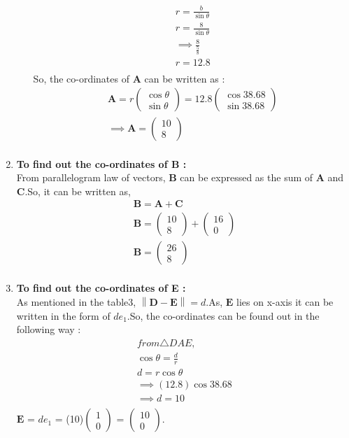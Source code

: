 \documentclass{article}
\providecommand{\norm}[1]{\left\lVert#1\right\rVert}
\newcommand{\myvec}[1]{\ensuremath{\begin{pmatrix}#1\end{pmatrix}}}
\let\vec\mathbf
\begin{document}
\begin{enumerate}
\begin{enumerate}
\begin{align}
			r = \frac{b}{\sin{\theta}}\\
			r = \frac{8}{\sin{\theta}}\\
			\implies \frac{8}{\frac{5}{8}}\\
			r = 12.8\\
		\end{align}
		So, the co-ordinates of $\vec{A}$ can be written as :\\
		\begin{align}
			\vec{A} = r\myvec{\cos{\theta}\\\sin{\theta}} = 12.8\myvec{\cos{38.68}\\\sin{38.68}}\\
			\implies \vec{A} = \myvec{10\\8} \\
		\end{align}
		\end{enumerate}
	\item \textbf{To find out the co-ordinates of B :}\\
		From parallelogram law of vectors, $\vec{B}$ can be expressed as the sum of $\vec{A}$ and $\vec{C}$.So, it can be written as,\\
		\begin{align}
			\vec{B} = \vec{A} + \vec{C}\\
			\vec{B} = \myvec{10\\8} + \myvec{16\\0}\\
			\vec{B} = \myvec{26\\8}\\
		\end{align}
	\item \textbf{To find out the co-ordinates of E :}\\
		As mentioned in the table3, $\norm{\vec{D} - \vec{E}} = d$.As, $\vec{E}$ lies on x-axis it can be written in the form of $de_1$.So, the co-ordinates can be found out in the following way : \\
		\begin{align}
			from \triangle{DAE},\\
			\cos{\theta} = \frac{d}{r}\\
			d = r\cos{\theta}\\
			\implies (12.8)\cos{38.68} \\
			\implies d = 10\\
		\end{align}
		 $\vec{E}$ = $de_1$ = (10)$\myvec{1\\0}$ = $\myvec{10\\0}$.\\

\end{enumerate}
\end{document}
